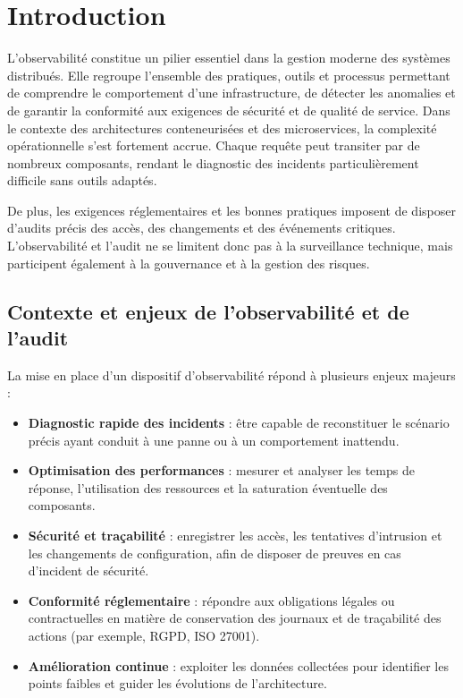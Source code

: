 \section{Introduction}

L’observabilité constitue un pilier essentiel dans la gestion moderne des systèmes distribués. Elle regroupe l’ensemble des pratiques, outils et processus permettant de comprendre le comportement d’une infrastructure, de détecter les anomalies et de garantir la conformité aux exigences de sécurité et de qualité de service.
Dans le contexte des architectures conteneurisées et des microservices, la complexité opérationnelle s’est fortement accrue. Chaque requête peut transiter par de nombreux composants, rendant le diagnostic des incidents particulièrement difficile sans outils adaptés.

De plus, les exigences réglementaires et les bonnes pratiques imposent de disposer d’audits précis des accès, des changements et des événements critiques. L’observabilité et l’audit ne se limitent donc pas à la surveillance technique, mais participent également à la gouvernance et à la gestion des risques.

\subsection{Contexte et enjeux de l'observabilité et de l'audit}

La mise en place d’un dispositif d’observabilité répond à plusieurs enjeux majeurs :

\begin{itemize}
	\item \textbf{Diagnostic rapide des incidents} : être capable de reconstituer le scénario précis ayant conduit à une panne ou à un comportement inattendu.
	\item \textbf{Optimisation des performances} : mesurer et analyser les temps de réponse, l’utilisation des ressources et la saturation éventuelle des composants.
	\item \textbf{Sécurité et traçabilité} : enregistrer les accès, les tentatives d’intrusion et les changements de configuration, afin de disposer de preuves en cas d’incident de sécurité.
	\item \textbf{Conformité réglementaire} : répondre aux obligations légales ou contractuelles en matière de conservation des journaux et de traçabilité des actions (par exemple, RGPD, ISO 27001).
	\item \textbf{Amélioration continue} : exploiter les données collectées pour identifier les points faibles et guider les évolutions de l’architecture.
\end{itemize}

